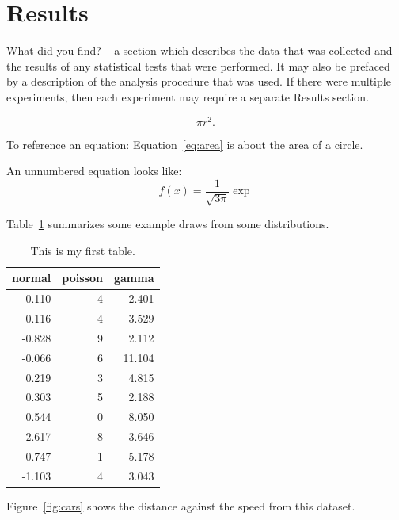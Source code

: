 \documentclass[12pt]{article}
\begin{document}
\section*{Results}
What did you find? – a section which describes the data that was collected and the results of any statistical tests that were performed.  It may also be prefaced by a description of the analysis procedure that was used. If there were multiple experiments, then each experiment may require a separate Results section.


\begin{equation}
    \label{eq:area}
    \pi r^2.
\end{equation}


To reference an equation:
Equation~\eqref{eq:area} is about the area of a circle. 
    


An unnumbered equation looks like:
\[
f(x)=\frac{1}{\sqrt{3\pi}}\exp
\]

Table~\ref{tab:rv} summarizes some example draws from some distributions.


\begin{table}[ht]
  \caption{This is my first table.}
  \label{tab:rv}
\centering
\begin{tabular}{rrr}
  \hline
normal & poisson & gamma \\ 
  \hline
-0.110 & 4 & 2.401 \\ 
  0.116 & 4 & 3.529 \\ 
  -0.828 & 9 & 2.112 \\ 
  -0.066 & 6 & 11.104 \\ 
  0.219 & 3 & 4.815 \\ 
  0.303 & 5 & 2.188 \\ 
  0.544 & 0 & 8.050 \\ 
  -2.617 & 8 & 3.646 \\ 
  0.747 & 1 & 5.178 \\ 
  -1.103 & 4 & 3.043 \\ 
   \hline
\end{tabular}
\end{table}

Figure~\ref{fig:cars} shows the distance against the speed from this dataset.
\end{document}
